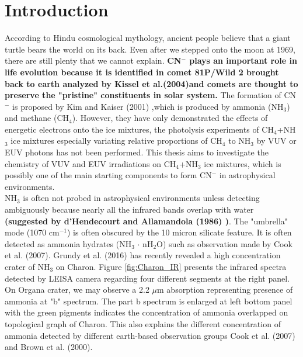 \chapter{\protect Introduction}
\label{introduction}

According to Hindu cosmological mythology, ancient people believe that a giant turtle bears the world on its back. Even after we stepped onto the moon at 1969, there are still plenty that we cannot explain. \textbf{CN$^-$ plays an important role in life evolution because it is identified in comet 81P/Wild 2 brought back to earth analyzed by Kissel et al.(2004)\cite{kissel2004cometary}and comets are thought to preserve the "pristine" constituents in solar system.} The formation of CN$^-$ is proposed by Kim and Kaiser (2001) \cite{kim},which is produced by ammonia (NH$_3$) and methane (CH$_4$). However, they have only demonstrated the effects of energetic electrons onto the ice mixtures, the photolysis experiments of CH$_4$+NH$_3$ ice mixtures especially variating relative proportions of CH$_4$ to NH$_3$ by VUV or EUV photons has not been performed. This thesis aims to investigate the chemistry of VUV and EUV irradiations on CH$_4$+NH$_3$ ice mixtures, which is possibly one of the main starting components to form CN$^-$ in astrophysical environments.\\

NH$_3$ is often not probed in astrophysical environments unless detecting ambiguously because nearly all the infrared bands overlap with water \textbf{(suggested by d'Hendecourt and Allamandola (1986) \cite{d1986time})}. The "umbrella" mode (1070 cm$^{-1}$) is often obscured by the 10 micron silicate feature. It is often detected as ammonia hydrates (NH$_3$ $\cdot$ nH$_2$O) such as observation made by Cook et al. (2007)\cite{cook2007near}. Grundy et al. (2016)\cite{grundy2016surface} has recently revealed a high concentration crater of NH$_3$ on Charon. Figure \ref{fig:Charon_IR} presents the infrared spectra detected by LEISA camera regarding four different segments at the right panel. On Organa crater, we may observe a 2.2 $\mu$m absorption representing presence of ammonia at "b" spectrum. The part b spectrum is enlarged at left bottom panel with the green pigments indicates the concentration of ammonia overlapped on topological graph of Charon. This also explains the different concentration of ammonia detected by different earth-based observation groups Cook et al. (2007)\cite{cook2007near} and Brown et al. (2000)\cite{brown2000evidence}.\\

